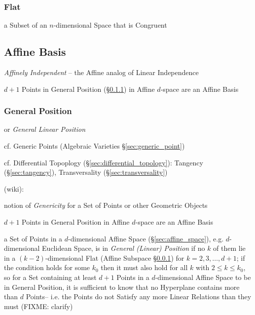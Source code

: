 \subsubsection{Flat}\label{sec:flat}

a Subset of an $n$-dimensional Space that is Congruent



\subsection{Affine Basis}\label{sec:affine_basis}

\emph{Affinely Independent} -- the Affine analog of Linear Independence

$d+1$ Points in General Position (\S\ref{sec:general_position}) in Affine
$d$-space are an Affine Basis



\subsubsection{General Position}\label{sec:general_position}

or \emph{General Linear Position}

\fist cf. Generic Points (Algebraic Varieties \S\ref{sec:generic_point})

\fist cf. Differential Topoplogy (\S\ref{sec:differential_topology}): Tangency
(\S\ref{sec:tangency}), Transversality (\S\ref{sec:transversality})

(wiki):

notion of \emph{Genericity} for a Set of Points or other Geometric Objects

$d+1$ Points in General Position in Affine $d$-space are an Affine Basis

a Set of Points in a $d$-dimensional Affine Space (\S\ref{sec:affine_space}),
e.g. $d$-dimensional Euclidean Space, is in \emph{General (Linear) Position} if
no $k$ of them lie in a $(k-2)$-dimensional Flat (Affine Subspace
\S\ref{sec:flat}) for $k = 2,3,\ldots,d+1$; if the condition holds for some
$k_0$ then it must also hold for all $k$ with $2 \leq k \leq k_0$, so for a
Set containing at least $d+1$ Points in a $d$-dimensional Affine Space to be in
General Position, it is sufficient to know that no Hyperplane contains more
than $d$ Points-- i.e. the Points do not Satisfy any more Linear Relations than
they must (FIXME: clarify)

